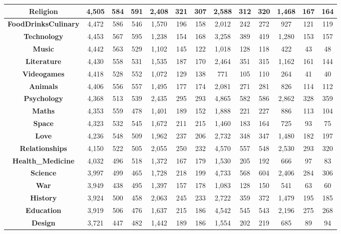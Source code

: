 \begin{table}[t]
{\begin{tabular}{|c||c|c|c||c|c|c||c|c|c||c|c|c|}
\textbf{Religion} & 4,505 & 584 & 591 & 2,408 & 321 & 307 & 2,588 & 312 & 320 & 1,468 & 167 & 164\\ \hline
\textbf{FoodDrinksCulinary} & 4,472 & 586 & 546 & 1,570 & 196 & 158 & 2,012 & 242 & 272 & 927 & 121 & 119\\ \hline
\textbf{Technology} & 4,453 & 567 & 595 & 1,238 & 154 & 168 & 3,258 & 389 & 419 & 1,280 & 153 & 157\\ \hline
\textbf{Music} & 4,442 & 563 & 529 & 1,102 & 145 & 122 & 1,018 & 128 & 118 & 422 & 43 & 48\\ \hline
\textbf{Literature} & 4,430 & 558 & 531 & 1,535 & 187 & 170 & 2,464 & 351 & 315 & 1,162 & 161 & 144\\ \hline
\textbf{Videogames} & 4,418 & 528 & 552 & 1,072 & 129 & 138 & 771 & 105 & 110 & 264 & 41 & 40\\ \hline
\textbf{Animals} & 4,406 & 556 & 557 & 1,495 & 177 & 174 & 2,081 & 271 & 281 & 826 & 114 & 112\\ \hline
\textbf{Psychology} & 4,368 & 513 & 539 & 2,435 & 295 & 293 & 4,865 & 582 & 586 & 2,862 & 328 & 359\\ \hline
\textbf{Maths} & 4,353 & 559 & 478 & 1,401 & 189 & 152 & 1,888 & 221 & 227 & 886 & 113 & 104\\ \hline
\textbf{Space} & 4,323 & 532 & 545 & 1,672 & 211 & 215 & 1,460 & 183 & 164 & 725 & 93 & 75\\ \hline
\textbf{Love} & 4,236 & 548 & 509 & 1,962 & 237 & 206 & 2,732 & 348 & 347 & 1,480 & 182 & 197\\ \hline
\textbf{Relationships} & 4,150 & 522 & 505 & 2,055 & 250 & 232 & 4,570 & 557 & 548 & 2,530 & 293 & 320\\ \hline
\textbf{Health\_Medicine} & 4,032 & 496 & 518 & 1,372 & 167 & 179 & 1,530 & 205 & 192 & 666 & 97 & 83\\ \hline
\textbf{Science} & 3,997 & 499 & 465 & 1,728 & 218 & 199 & 4,733 & 568 & 604 & 2,406 & 284 & 306\\ \hline
\textbf{War} & 3,949 & 438 & 495 & 1,397 & 157 & 178 & 1,083 & 128 & 150 & 541 & 63 & 60\\ \hline
\textbf{History} & 3,924 & 500 & 458 & 2,063 & 245 & 233 & 2,722 & 359 & 372 & 1,479 & 195 & 185\\ \hline
\textbf{Education} & 3,919 & 506 & 476 & 1,637 & 215 & 186 & 4,542 & 545 & 543 & 2,196 & 275 & 268\\ \hline
\textbf{Design} & 3,721 & 447 & 482 & 1,442 & 189 & 186 & 1,554 & 202 & 219 & 685 & 89 & 94\\ \hline

\end{tabular}}
\end{table}
